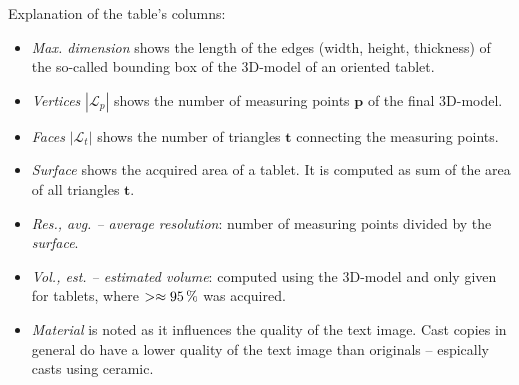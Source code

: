 \documentclass[12pt,a4paper]{article}
\begin{document}
	Explanation of the table's columns:
	\begin{itemize}
		\item \emph{Max. dimension} shows the length of the edges (width, height, thickness) of the so-called bounding box of the 3D-model of an oriented tablet.
		\item \emph{Vertices} $|\mathcal{L}_{p}|$ shows the number of measuring points $\mathbf{p}$ of the final 3D-model.
		\item \emph{Faces} $|\mathcal{L}_{t}|$ shows the number of triangles $\mathbf{t}$ connecting the measuring points.
		\item \emph{Surface} shows the acquired area of a tablet. It is computed as sum of the area of all triangles $\mathbf{t}$. 
		\item \emph{Res., avg. -- average resolution}: number of measuring points divided by the \emph{surface}.
		\item \emph{Vol., est. -- estimated volume}: computed using the 3D-model and only given for tablets, where $>\approx 95\, \%$ was acquired.
		\item \emph{Material} is noted as it influences the quality of the text image. 
		      Cast copies in general do have a lower quality of the text image than originals -- espically casts using ceramic.
	\end{itemize}





\end{document}
